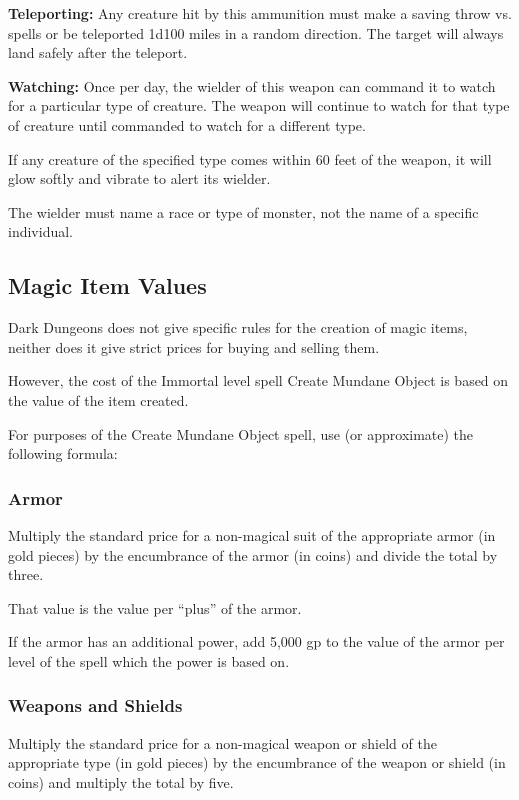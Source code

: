 \begin{multicols*}{2}
\textbf{Teleporting:} Any creature hit by this ammunition must make a saving throw vs. spells or be teleported 1d100 miles in a random direction. The target will always land safely after the teleport.

\textbf{Watching:} Once per day, the wielder of this weapon can command it to watch for a particular type of creature. The weapon will continue to watch for that type of creature until commanded to watch for a different type.

If any creature of the specified type comes within 60 feet of the weapon, it will glow softly and vibrate to alert its wielder.

The wielder must name a race or type of monster, not the name of a specific individual.

\subsection{Magic Item Values}
Dark Dungeons does not give specific rules for the creation of magic items, neither does it give strict prices for buying and selling them.

However, the cost of the Immortal level spell Create Mundane Object is based on the value of the item created.

For purposes of the Create Mundane Object spell, use (or approximate) the following formula:

\subsubsection{Armor}
Multiply the standard price for a non-magical suit of the appropriate armor (in gold pieces) by the encumbrance of the armor (in coins) and divide the total by three.

That value is the value per “plus” of the armor.

If the armor has an additional power, add 5,000 gp to the value of the armor per level of the spell which the power is based on.

\subsubsection{Weapons and Shields}
Multiply the standard price for a non-magical weapon or shield of the appropriate type (in gold pieces) by the encumbrance of the weapon or shield (in coins) and multiply the total by five.


\end{multicols*}
